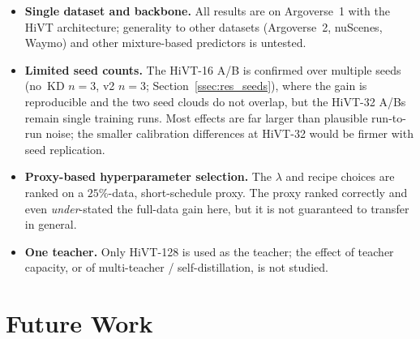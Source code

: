\begin{itemize}[leftmargin=1.4em]
  \item \textbf{Single dataset and backbone.} All results are on Argoverse~1 with
        the HiVT architecture; generality to other datasets (Argoverse~2,
        nuScenes, Waymo) and other mixture-based predictors is untested.
  \item \textbf{Limited seed counts.} The HiVT-16 A/B is confirmed over multiple
        seeds (no~KD $n{=}3$, v2 $n{=}3$; Section~\ref{ssec:res_seeds}), where the
        gain is reproducible and the two seed clouds do not overlap, but the HiVT-32 A/Bs
        remain single training runs. Most effects are far larger than plausible
        run-to-run noise; the smaller calibration differences at HiVT-32 would be
        firmer with seed replication.
  \item \textbf{Proxy-based hyperparameter selection.} The $\lambda$ and recipe
        choices are ranked on a $25\%$-data, short-schedule proxy. The proxy ranked
        correctly and even \emph{under}-stated the full-data gain here, but it is
        not guaranteed to transfer in general.
  \item \textbf{One teacher.} Only HiVT-128 is used as the teacher; the effect of
        teacher capacity, or of multi-teacher / self-distillation, is not studied.
\end{itemize}

\section{Future Work}
\label{sec:concl_future}


